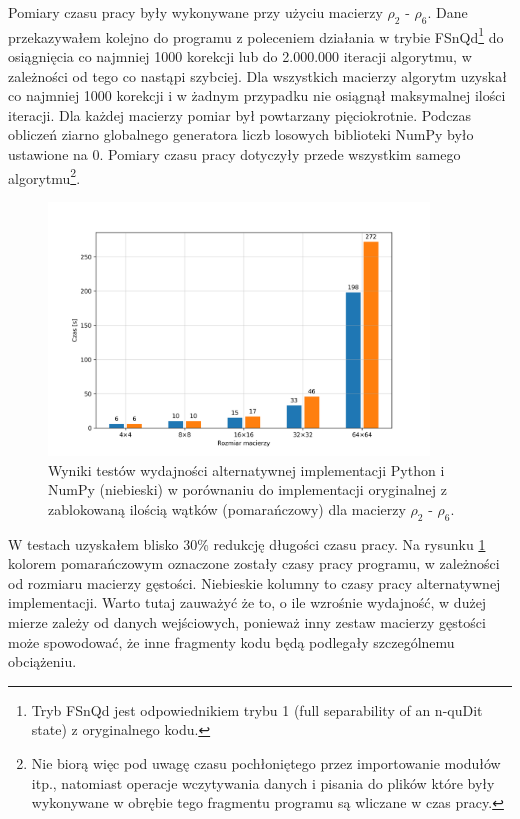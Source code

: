 \documentclass[10pt, a4paper]{article}
\begin{document}
\begin{sloppypar}
    Pomiary czasu pracy były wykonywane przy użyciu macierzy $\rho_{2}$ - $\rho_{6}$.
    Dane przekazywałem kolejno do programu z poleceniem działania w trybie FSnQd\footnote{Tryb
    FSnQd jest odpowiednikiem trybu 1 (full separability of an n-quDit state) z oryginalnego
    kodu.} do osiągnięcia co najmniej 1000 korekcji lub do 2.000.000 iteracji algorytmu,
    w zależności od tego co nastąpi szybciej. Dla wszystkich macierzy algorytm uzyskał
    co najmniej 1000 korekcji i w żadnym przypadku nie osiągnął maksymalnej ilości
    iteracji. Dla każdej macierzy pomiar był powtarzany pięciokrotnie. Podczas obliczeń
    ziarno globalnego generatora liczb losowych biblioteki NumPy było ustawione na 0.
    Pomiary czasu pracy dotyczyły przede wszystkim samego algorytmu\footnote{Nie biorą więc
    pod uwagę czasu pochłoniętego przez importowanie modułów itp., natomiast operacje wczytywania
    danych i pisania do plików które były wykonywane w obrębie tego fragmentu programu są
    wliczane w czas pracy.}.

    \FloatBarrier
    \begin{figure}[h]
      \centering
      \includegraphics[width=0.9\textwidth]{"resources/benchmark_2/plot.png"}
      \caption{Wyniki testów wydajności alternatywnej implementacji Python i NumPy (niebieski) w porównaniu do implementacji oryginalnej z zablokowaną ilością wątków (pomarańczowy) dla macierzy $\rho
      _{2}$ - $\rho_{6}$.}
      \label{first-perf}
    \end{figure}
    \FloatBarrier

    W testach uzyskałem blisko 30\% redukcję długości czasu pracy. Na rysunku
    \ref{first-perf} kolorem pomarańczowym oznaczone zostały czasy pracy programu, w zależności
    od rozmiaru macierzy gęstości. Niebieskie kolumny to czasy pracy alternatywnej
    implementacji. Warto tutaj zauważyć że to, o ile wzrośnie wydajność, w dużej mierze zależy
    od danych wejściowych, ponieważ inny zestaw macierzy gęstości może spowodować, że inne
    fragmenty kodu będą podlegały szczególnemu obciążeniu.


\end{sloppypar}
\end{document}
